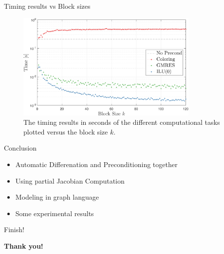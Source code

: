 \documentclass{beamer}
\begin{document}
\begin{frame}{Timing results vs Block sizes}
\begin{figure}
\centering
\includegraphics[width=0.8\textwidth]{timings}
\caption{The timing results in seconds of the different computational tasks plotted versus the block size $k$.}
\end{figure}
\end{frame}
\begin{frame}{Conclusion}
\begin{itemize}
\item Automatic Differenation and Preconditioning together
\item Using partial Jacobian Computation
\item Modeling in graph language
\item Some experimental results
\end{itemize}
\end{frame}

\begin{frame}{Finish!}
\begin{center}
   \Huge \bf Thank you!
\end{center}
\end{frame}
\end{document}
